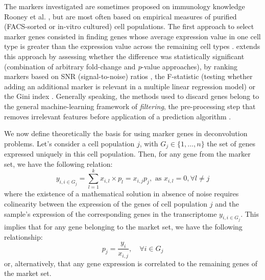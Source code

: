 The markers investigated are sometimes proposed on immunology knowledge
Rooney et al. \autocite{rooney_etal15}, but are
most often based on empirical measures of purified (FACS-sorted or
in-vitro cultured) cell populations. The first approach to select marker
genes consisted in finding genes whose average expression value in one
cell type is greater than the expression value across the remaining cell
types \autocite{shoemaker_etal12}.
\autocite{chikina_etal15} extends this approach by assessing whether the difference was
statistically significant (combination of arbitrary fold-change and
\emph{p}-value approaches), by ranking markers based on SNR
(signal-to-noise) ratios \autocite{becht_etal16}, the F-statistic (testing whether adding an additional marker
is relevant in a multiple linear regression model)
\autocite{wang_etal10} or the Gini
index \autocite{zhang_etal17}.
Generally speaking, the methods used to discard genes belong to the
general machine-learning framework of \emph{filtering}, the
pre-processing step that removes irrelevant features before application
of a prediction algorithm
\autocite{guyon_elisseeff03}.

We now define theoretically the basis for using marker genes in
deconvolution problems. Let's consider a cell population \(j\), with
\(G_j \in \{1, \ldots, n\}\) the set of genes expressed uniquely in this
cell population. Then, for any gene from the marker set, we have the
following relation: \[
y_{i, i \in G_j}= \sum_{l=1}^k x_{i, l} \times p_{l} = x_{i, j} p_j, \text{ as } x_{i, l} =0, \forall l \neq j
\] where the existence of a mathematical solution in absence of noise
requires colinearity between the expression of the genes of cell
population \(j\) and the sample's expression of the corresponding genes
in the transcriptome \(y_{i, i \in G_j}\). This implies that for any
gene belonging to the market set, we have the following relationship: \[
p_{j}=\frac{y_i}{x_{i, j}}, \quad \forall i \in {G_j}
\] or, alternatively, that any gene expression is correlated to the
remaining genes of the market set.

